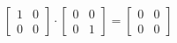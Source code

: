 \documentclass[preview]{standalone}
\begin{document}
\begin{center}
$\begin{bmatrix} 1 & 0 \\ 0 & 0 \end{bmatrix} \cdot \begin{bmatrix} 0 & 0 \\ 0 & 1 \end{bmatrix} = \begin{bmatrix} 0 & 0 \\ 0 & 0 \end{bmatrix}$
\end{center}
\end{document}
